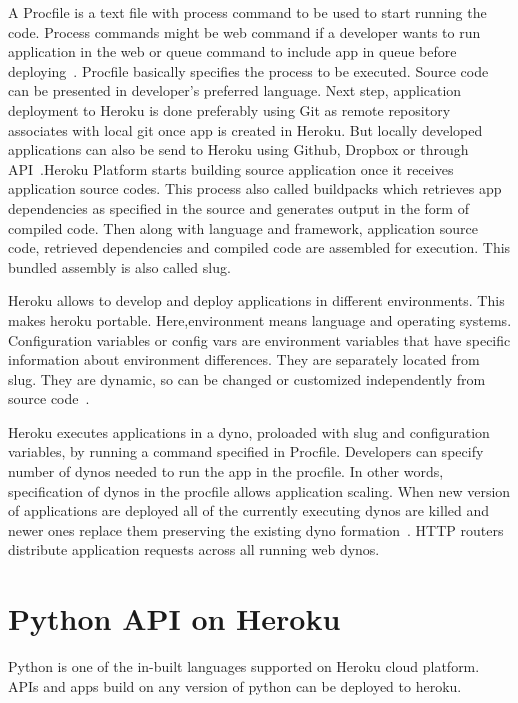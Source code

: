  A Procfile is a text file with 
 process command to be used to start running the code. Process commands might
 be web command if a developer wants to run application in the web or queue
 command to include app in queue before deploying~\cite{hid-sp18-415-www-how-heroku-works}.
 Procfile basically specifies the process to be executed.
 Source code can be presented in developer's preferred language.
Next step, application deployment to Heroku is done preferably using Git
 as remote repository associates with local git  once app is created in Heroku.
 But locally developed applications can also be send to Heroku using Github,
 Dropbox or through API~\cite{hid-sp18-415-www-how-heroku-works}.Heroku Platform starts 
 building source application once it receives application source codes. This 
 process also called buildpacks which retrieves app dependencies as specified 
 in the source and generates output in the form of compiled code. Then along
 with language and framework, application source code, retrieved dependencies
 and compiled code are assembled for execution. This bundled assembly is also
 called slug.

 Heroku allows to develop and deploy applications in different environments.
 This makes heroku portable. Here,environment means language and operating
 systems. Configuration variables or config vars are environment variables
 that have specific information about environment differences. They are
 separately located from slug. They are dynamic, so can be changed or
 customized independently from source code~\cite{hid-sp18-415-www-how-heroku-works}.

 Heroku executes applications in a dyno, proloaded with slug and configuration
 variables, by running a command specified in Procfile. Developers can specify
 number of dynos needed to run the app in the procfile. In other words,
 specification of dynos in the procfile allows application scaling. When new
 version of applications are deployed all of the currently executing dynos are
 killed and newer ones replace them preserving the existing dyno
 formation~\cite{hid-sp18-415-www-how-heroku-works}. HTTP routers distribute application
 requests across all running web dynos. 


\section{Python API on Heroku}
 Python is one of the in-built languages supported on Heroku cloud platform.
 APIs and apps build on any version of python can be deployed to heroku.


